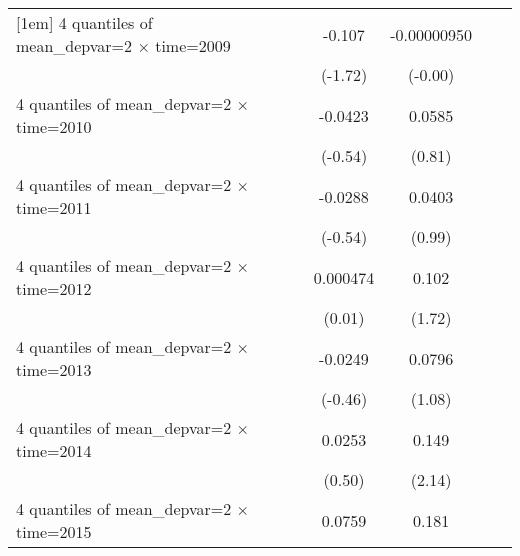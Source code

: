 \begin{table}[htbp]
\begin{tabular}{l*{6}{c}}
[1em]
4 quantiles of mean\_depvar=2 $\times$ time=2009&                     &                     &      -0.107         & -0.00000950         &                     &                     \\
                    &                     &                     &     (-1.72)         &     (-0.00)         &                     &                     \\
[1em]
4 quantiles of mean\_depvar=2 $\times$ time=2010&                     &                     &     -0.0423         &      0.0585         &                     &                     \\
                    &                     &                     &     (-0.54)         &      (0.81)         &                     &                     \\
[1em]
4 quantiles of mean\_depvar=2 $\times$ time=2011&                     &                     &     -0.0288         &      0.0403         &                     &                     \\
                    &                     &                     &     (-0.54)         &      (0.99)         &                     &                     \\
[1em]
4 quantiles of mean\_depvar=2 $\times$ time=2012&                     &                     &    0.000474         &       0.102\sym{*}  &                     &                     \\
                    &                     &                     &      (0.01)         &      (1.72)         &                     &                     \\
[1em]
4 quantiles of mean\_depvar=2 $\times$ time=2013&                     &                     &     -0.0249         &      0.0796         &                     &                     \\
                    &                     &                     &     (-0.46)         &      (1.08)         &                     &                     \\
[1em]
4 quantiles of mean\_depvar=2 $\times$ time=2014&                     &                     &      0.0253         &       0.149\sym{**} &                     &                     \\
                    &                     &                     &      (0.50)         &      (2.14)         &                     &                     \\
[1em]
4 quantiles of mean\_depvar=2 $\times$ time=2015&                     &                     &      0.0759         &       0.181\sym{**} &                     &                     \\

\end{tabular}
\end{table}
